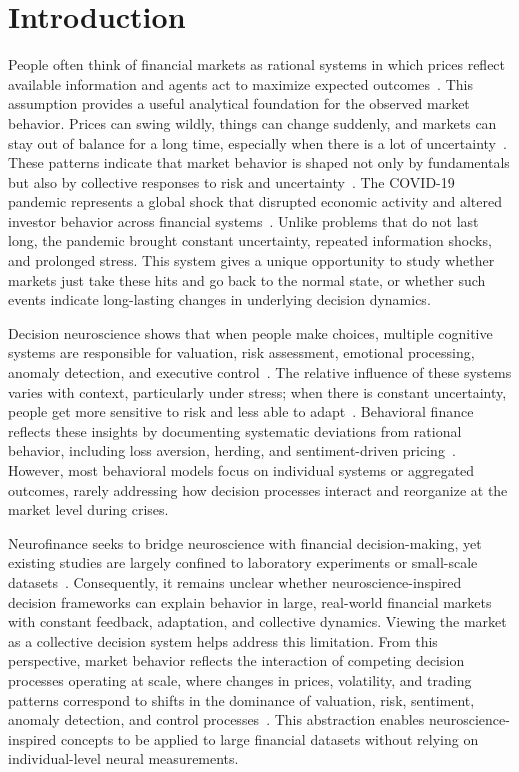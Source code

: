 \documentclass[runningheads,10pt]{llncs}
\begin{document}
\vspace{-15pt}
\section{Introduction}
\vspace{-10pt}
People often think of financial markets as rational systems in which prices reflect available information and agents act to maximize expected outcomes~\cite{lo2004}. This assumption provides a useful analytical foundation for the observed market behavior. Prices can swing wildly, things can change suddenly, and markets can stay out of balance for a long time, especially when there is a lot of uncertainty~\cite{hamilton1989}. These patterns indicate that market behavior is shaped not only by fundamentals but also by collective responses to risk and uncertainty~\cite{shiller2021,farmer2019}. The COVID-19 pandemic represents a global shock that disrupted economic activity and altered investor behavior across financial systems~\cite{baker2020,zaremba2021}. Unlike problems that do not last long, the pandemic brought constant uncertainty, repeated information shocks, and prolonged stress. This system gives a unique opportunity to study whether markets just take these hits and go back to the normal state, or whether such events indicate long-lasting changes in underlying decision dynamics.

Decision neuroscience shows that when people make choices, multiple cognitive systems are responsible for valuation, risk assessment, emotional processing, anomaly detection, and executive control~\cite{glimcher2014}. The relative influence of these systems varies with context, particularly under stress; when there is constant uncertainty, people get more sensitive to risk and less able to adapt~\cite{bach2012,coates2012}. Behavioral finance reflects these insights by documenting systematic deviations from rational behavior, including loss aversion, herding, and sentiment-driven pricing~\cite{kahneman1979,demartino2010}. However, most behavioral models focus on individual systems or aggregated outcomes, rarely addressing how decision processes interact and reorganize at the market level during crises.

Neurofinance seeks to bridge neuroscience with financial decision-making, yet existing studies are largely confined to laboratory experiments or small-scale datasets~\cite{boorman2009,alcaro2011}. Consequently, it remains unclear whether neuroscience-inspired decision frameworks can explain behavior in large, real-world financial markets with constant feedback, adaptation, and collective dynamics. Viewing the market as a collective decision system helps address this limitation. From this perspective, market behavior reflects the interaction of competing decision processes operating at scale, where changes in prices, volatility, and trading patterns correspond to shifts in the dominance of valuation, risk, sentiment, anomaly detection, and control processes~\cite{farmer2019}. This abstraction enables neuroscience-inspired concepts to be applied to large financial datasets without relying on individual-level neural measurements.
\end{document}
